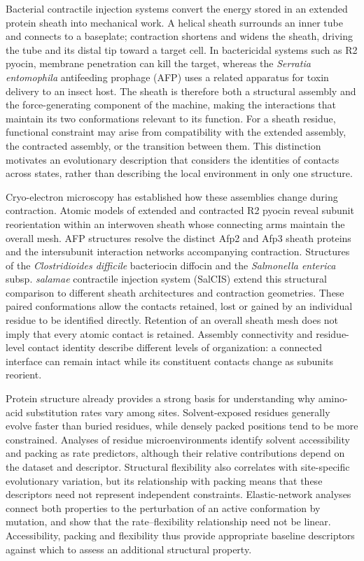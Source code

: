 \documentclass[11pt,a4paper]{article}
\begin{document}
Bacterial contractile injection systems convert the energy stored in an extended protein sheath into mechanical work. A helical sheath surrounds an inner tube and connects to a baseplate; contraction shortens and widens the sheath, driving the tube and its distal tip toward a target cell. In bactericidal systems such as R2 pyocin, membrane penetration can kill the target, whereas the \emph{Serratia entomophila} antifeeding prophage (AFP) uses a related apparatus for toxin delivery to an insect host.\cite{ref1,ref2} The sheath is therefore both a structural assembly and the force-generating component of the machine, making the interactions that maintain its two conformations relevant to its function. For a sheath residue, functional constraint may arise from compatibility with the extended assembly, the contracted assembly, or the transition between them. This distinction motivates an evolutionary description that considers the identities of contacts across states, rather than describing the local environment in only one structure.

Cryo-electron microscopy has established how these assemblies change during contraction. Atomic models of extended and contracted R2 pyocin reveal subunit reorientation within an interwoven sheath whose connecting arms maintain the overall mesh.\cite{ref1} AFP structures resolve the distinct Afp2 and Afp3 sheath proteins and the intersubunit interaction networks accompanying contraction.\cite{ref2} Structures of the \emph{Clostridioides difficile} bacteriocin diffocin and the \emph{Salmonella enterica} subsp. \emph{salamae} contractile injection system (SalCIS) extend this structural comparison to different sheath architectures and contraction geometries.\cite{ref3,ref4} These paired conformations allow the contacts retained, lost or gained by an individual residue to be identified directly. Retention of an overall sheath mesh does not imply that every atomic contact is retained. Assembly connectivity and residue-level contact identity describe different levels of organization: a connected interface can remain intact while its constituent contacts change as subunits reorient.

Protein structure already provides a strong basis for understanding why amino-acid substitution rates vary among sites. Solvent-exposed residues generally evolve faster than buried residues, while densely packed positions tend to be more constrained. Analyses of residue microenvironments identify solvent accessibility and packing as rate predictors, although their relative contributions depend on the dataset and descriptor.\cite{ref5,ref6} Structural flexibility also correlates with site-specific evolutionary variation, but its relationship with packing means that these descriptors need not represent independent constraints. Elastic-network analyses connect both properties to the perturbation of an active conformation by mutation, and show that the rate--flexibility relationship need not be linear.\cite{ref7} Accessibility, packing and flexibility thus provide appropriate baseline descriptors against which to assess an additional structural property.
\end{document}

